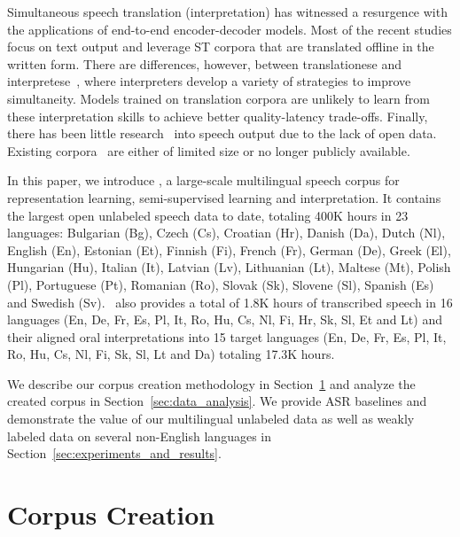 Simultaneous speech translation (interpretation) has witnessed a resurgence with the applications of end-to-end encoder-decoder models. Most of the recent studies focus on text output and leverage ST corpora that are translated offline in the written form. There are differences, however, between translationese and interpretese~\citep{sridhar2013corpus,he2016interpretese}, where interpreters develop a variety of strategies to improve simultaneity. Models trained on translation corpora are unlikely to learn from these interpretation skills to achieve better quality-latency trade-offs. Finally, there has been little research~\citep{translatotron,tjandra2019speech,zhang2020uwspeech} into speech output due to the lack of open data. Existing corpora~\citep{tohyama2004ciair,bendazzoli2005approach} are either of limited size or no longer publicly available.

In this paper, we introduce \vp, a large-scale multilingual speech corpus for representation learning, semi-supervised learning and interpretation. It contains the largest open unlabeled speech data to date, totaling 400K hours in 23 languages: Bulgarian (Bg), Czech (Cs), Croatian (Hr), Danish (Da), Dutch (Nl), English (En), Estonian (Et), Finnish (Fi), French (Fr), German (De), Greek (El), Hungarian (Hu), Italian (It), Latvian (Lv), Lithuanian (Lt), Maltese (Mt), Polish (Pl), Portuguese (Pt), Romanian (Ro), Slovak (Sk), Slovene (Sl), Spanish (Es) and Swedish (Sv). \vp~also provides a total of 1.8K hours of transcribed speech in 16 languages (En, De, Fr, Es, Pl, It, Ro, Hu, Cs, Nl, Fi, Hr, Sk, Sl, Et and Lt) and their aligned oral interpretations into 15 target languages (En, De, Fr, Es, Pl, It, Ro, Hu, Cs, Nl, Fi, Sk, Sl, Lt and Da) totaling 17.3K hours.

We describe our corpus creation methodology in Section~\ref{sec:corpus_creation} and analyze the created corpus in Section~\ref{sec:data_analysis}. We provide ASR baselines and demonstrate the value of our multilingual unlabeled data as well as weakly labeled data on several non-English languages in Section~\ref{sec:experiments_and_results}.

\section{Corpus Creation}
\label{sec:corpus_creation}
